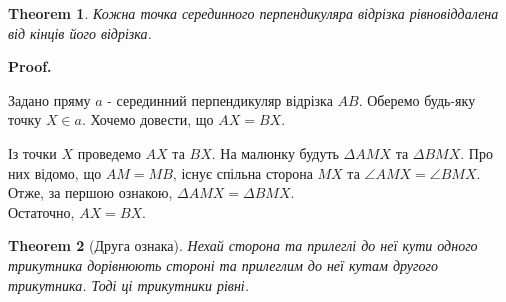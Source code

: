 \documentclass[a4paper, 10pt]{article}
\makeatletter
\def\qed{$\blacksquare$}
\theoremstyle{theoremdd}
\newtheorem{theorem}{Theorem}[subsection]
\theoremstyle{theoremdd}
\theoremstyle{theoremdd}
\theoremstyle{theoremdd}
\theoremstyle{theoremdd}
\theoremstyle{theoremdd}
\theoremstyle{theoremdd}
\theoremstyle{theoremdd}
\theoremstyle{theoremdd}
\renewenvironment{proof}[1][Proof.\\]{\par
\pushQED{\hfill \qed}%
\normalfont \topsep6\p@\@plus6\p@\relax
\trivlist
\item\relax
{\bfseries
#1\@addpunct{.}}\hspace\labelsep\ignorespaces
}{%
\popQED\endtrivlist\@endpefalse
}
\makeatother
\begin{document}
\begin{theorem}
Кожна точка серединного перпендикуляра відрізка рівновіддалена від кінців його відрізка.
\end{theorem}

\begin{proof}
Задано пряму $a$ - серединний перпендикуляр відрізка $AB$. Оберемо будь-яку точку $X \in a$. Хочемо довести, що $AX = BX$.
\begin{figure}[H]
\centering
{}
\end{figure}
Із точки $X$ проведемо $AX$ та $BX$. На малюнку будуть $\Delta AMX$ та $\Delta BMX$. Про них відомо, що $AM = MB$, існує спільна сторона $MX$ та $\angle AMX = \angle BMX$. Отже, за першою ознакою, $\Delta AMX = \Delta BMX$.\\
Остаточно, $AX = BX$.
\end{proof}

\begin{theorem}[Друга ознака]
Нехай сторона та прилеглі до неї кути одного трикутника дорівнюють стороні та прилеглим до неї кутам другого трикутника. Тоді ці трикутники рівні.
\end{theorem}
\end{document}
